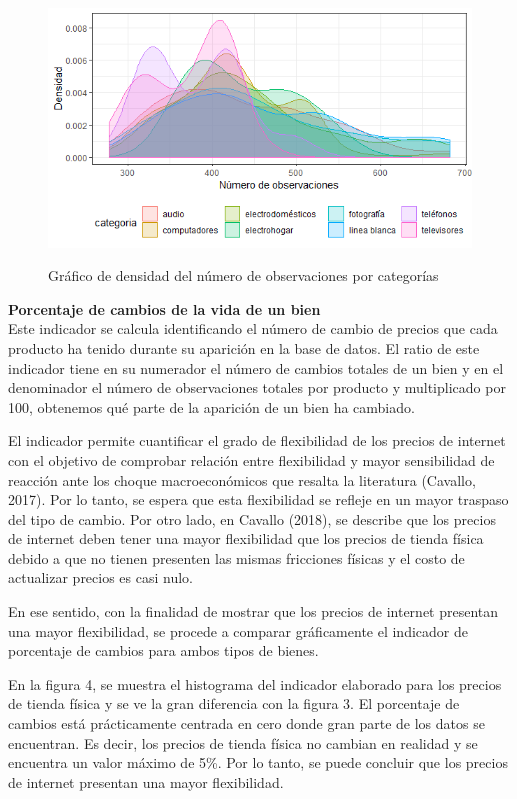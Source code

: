 \documentclass[12pt,a4paper,pdflatex]{article}
\begin{document}
\begin{figure}[!ht]
\centering
 \caption{Gráfico de densidad del número de observaciones por categorías}
\includegraphics[scale=1.0]{observaciones_categoria.png}
  \label{fig:Gráfico de densidad del número de observaciones por categorías}
\end{figure}

\clearpage
\textbf{Porcentaje de cambios de la vida de un bien} \\
Este indicador se calcula identificando el número de cambio de precios que cada producto ha tenido durante su aparición en la base de datos. El ratio de este indicador tiene en su numerador el número de cambios totales de un bien y en el denominador el número de observaciones totales por producto y multiplicado por 100, obtenemos qué parte de la aparición de un bien ha cambiado.

El indicador permite cuantificar el grado de flexibilidad de los precios de internet con el objetivo de comprobar relación entre flexibilidad y mayor sensibilidad de reacción ante los choque macroeconómicos que resalta la literatura (Cavallo, 2017). Por lo tanto, se espera que esta flexibilidad se refleje en un mayor traspaso del tipo de cambio. Por otro lado, en Cavallo (2018), se describe que los precios de internet deben tener una mayor flexibilidad que los precios de tienda física debido a que no tienen presenten las mismas fricciones físicas y el costo de actualizar precios es casi nulo.

En ese sentido, con la finalidad de mostrar que los precios de internet presentan una mayor flexibilidad, se procede a comparar gráficamente el indicador de porcentaje de cambios para ambos tipos de bienes.

En la figura 4, se muestra el histograma del indicador elaborado para los precios de tienda física y se ve la gran diferencia con la figura 3. El porcentaje de cambios está prácticamente centrada en cero donde gran parte de los datos se encuentran. Es decir, los precios de tienda física no cambian en realidad y se encuentra un valor máximo de 5\%. Por lo tanto, se puede concluir que los precios de internet presentan una mayor flexibilidad.
\end{document}
